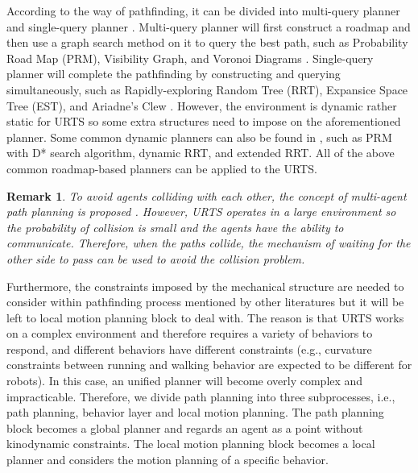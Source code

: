 \documentclass{ieeeaccess}
\newtheorem{remark}{Remark}
\begin{document}
According to the way of pathfinding, it can be divided into multi-query planner and single-query planner \cite{elbanhawi2014sampling}. Multi-query planner will first construct a roadmap and then use a graph search method on it to query the best path, such as Probability Road Map (PRM), Visibility Graph, and Voronoi Diagrams \cite{liu2018survey}. Single-query planner will complete the pathfinding by constructing and querying simultaneously,
such as Rapidly-exploring Random Tree (RRT), Expansice Space Tree (EST), and Ariadne's Clew \cite{elbanhawi2014sampling}. However, the environment is dynamic rather static for URTS so some extra structures need to impose on the aforementioned planner. Some common dynamic planners can also be found in \cite{elbanhawi2014sampling}, such as PRM with D* search algorithm, dynamic RRT, and extended RRT. All of the above common roadmap-based planners can be applied to the URTS.

\begin{remark}
    To avoid agents colliding with each other, the concept of multi-agent path planning is proposed \cite{yu2013multi}. However, URTS operates in a large environment so the probability of collision is small and the agents have the ability to communicate. Therefore, when the paths collide, the mechanism of waiting for the other side to pass can be used to avoid the collision problem.
\end{remark}

Furthermore, the constraints imposed by the mechanical structure are needed to consider within pathfinding process mentioned by other literatures but it will be left to local motion planning block to deal with. The reason is that URTS works on a complex environment and therefore requires a variety of behaviors to respond, and different behaviors have different constraints (e.g., curvature constraints between running and walking behavior are expected to be different for robots). In this case, an unified planner will become overly complex and impracticable. Therefore, we divide path planning into three subprocesses, i.e., path planning, behavior layer and local motion planning. The path planning block becomes a global planner and regards an agent as a point without kinodynamic constraints. The local motion planning block becomes a local planner and considers the motion planning of a specific behavior.
\end{document}
